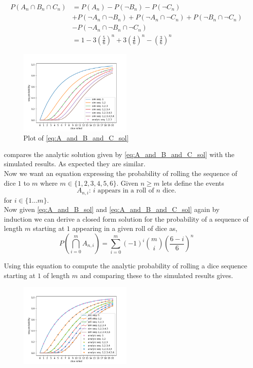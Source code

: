\documentclass[12pt,a4paper]{article}
\begin{document}
\begin{align}
P(A_n \cap B_n \cap C_n)    &= P(A_n) - P(\neg B_n) - P(\neg C_n)\\
                            &+ P(\neg A_n \cap \neg B_n) + P(\neg A_n \cap \neg C_n) + P(\neg B_n \cap \neg C_n)\\ 
                            &- P(\neg A_n \cap \neg B_n \cap \neg C_n)\\
                            &= 1 - 3\left(\frac{5}{6}\right)^n + 3\left(\frac{4}{6}\right)^n - \left(\frac{3}{6}\right)^n
\label{eq:A_and_B_and_C_sol}
\end{align}
\begin{figure}[H]
    \centering
    \includegraphics[width=0.5\textwidth]{figs/compare_analytic_sim.png}
    \caption{Plot of \cref{eq:A_and_B_and_C_sol}}
    \label{fig:compare_analytic_sim}
\end{figure}
 compares the analytic solution given by \cref{eq:A_and_B_and_C_sol} with the simulated results. As expected they are similar.\\


Now we want an equation expressing the probability of rolling the sequence of dice $1$ to $m$ where $m\in\{1,2,3,4,5,6\}$. Given $n\geq m$ lets define the events
\begin{equation*}
A_{n,i} \text{: $i$ appears in a roll of $n$ dice.}
\end{equation*}
for $i \in \{1\ldots m\}$.\\

Now given \cref{eq:A_and_B_sol} and \cref{eq:A_and_B_and_C_sol} again by induction we can derive a closed form solution for the probability of a sequence of length $m$ starting at $1$ appearing in a given roll of dice as,
\begin{equation}
P\left(\bigcap_{i=0}^m A_{n,i}\right) = \sum_{i=0}^{m} (-1)^i \binom{m}{i}\left( \frac{6-i}{6} \right)^n
\end{equation}

Using this equation to compute the analytic probability of rolling a dice sequence starting at $1$ of length $m$ and comparing these to the simulated results gives.

\begin{figure}[H]
    \centering
    \includegraphics[width=0.5\textwidth]{figs/full_compare_analytic_sim.png}
    \caption{}
    \label{fig:full_compare_analytic_sim}
\end{figure}
\end{document}
